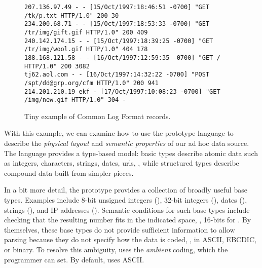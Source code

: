 \documentclass{sigplanconf}
\begin{document}
\begin{figure*}
\begin{footnotesize}
\begin{verbatim}
207.136.97.49 - - [15/Oct/1997:18:46:51 -0700] "GET /tk/p.txt HTTP/1.0" 200 30
234.200.68.71 - - [15/Oct/1997:18:53:33 -0700] "GET /tr/img/gift.gif HTTP/1.0" 200 409
240.142.174.15 - - [15/Oct/1997:18:39:25 -0700] "GET /tr/img/wool.gif HTTP/1.0" 404 178
188.168.121.58 - - [16/Oct/1997:12:59:35 -0700] "GET / HTTP/1.0" 200 3082
tj62.aol.com - - [16/Oct/1997:14:32:22 -0700] "POST /spt/dd@grp.org/cfm HTTP/1.0" 200 941
214.201.210.19 ekf - [17/Oct/1997:10:08:23 -0700] "GET /img/new.gif HTTP/1.0" 304 -
\end{verbatim}
\caption{Tiny example of Common Log Format records. }
\label{figure:clf-records}
\end{footnotesize}
\end{figure*}

With this example, we can examine how to use the prototype 
\pads{} language to describe 
the {\em physical layout} and 
{\em semantic properties} of our ad hoc data source. 
The language provides a type-based model:
basic types describe atomic data such as integers, characters, 
strings, dates, urls, \etc, while
structured types describe compound data built from simpler pieces.

In a bit more detail,
the \pads{} prototype provides a collection of broadly useful base
types.  Examples include 8-bit unsigned integers (), 32-bit
integers (), dates (), strings (),
and IP addresses ().  Semantic conditions for such base types
include checking that the resulting number fits in the indicated
space, \ie, 16-bits for .  By themselves, these base types
do not provide sufficient information to allow parsing because they do
not specify how the data is coded, \ie{}, in ASCII, EBCDIC, or binary.
To resolve this ambiguity, \pads{} uses the \textit{ambient} coding,
which the programmer can set.  By default, \pads{} uses ASCII.  
\end{document}
